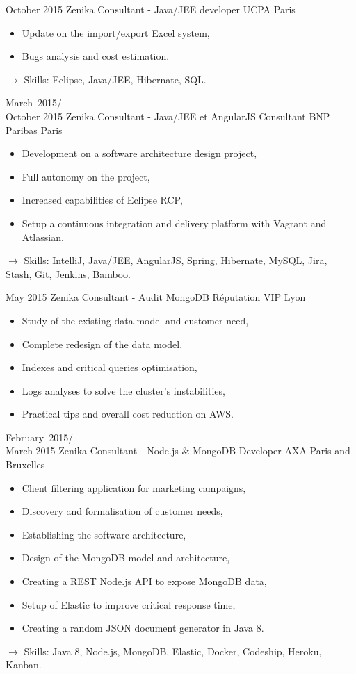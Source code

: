 \documentclass[11pt,a4paper]{moderncv}
\begin{document}
\cventry
{October 2015}
{Zenika Consultant - Java/JEE developer}
{UCPA}
{Paris}
{}
{\begin{itemize}
\item Update on the import/export Excel system,
\item Bugs analysis and cost estimation.
\end{itemize}
$\rightarrow$ Skills: Eclipse, Java/JEE, Hibernate, SQL.
}   %

\cventry
{March\ 2015/\\October 2015}
{Zenika Consultant - Java/JEE et AngularJS Consultant}
{BNP Paribas}
{Paris}
{}
{\begin{itemize}
\item Development on a software architecture design project,
\item Full autonomy on the project,
\item Increased capabilities of Eclipse RCP,
\item Setup a continuous integration and delivery platform with Vagrant and Atlassian.
\end{itemize}
$\rightarrow$ Skills: IntelliJ, Java/JEE, AngularJS, Spring, Hibernate, MySQL, Jira, Stash, Git, Jenkins, Bamboo.
}   %

\cventry
{May 2015}
{Zenika Consultant - Audit MongoDB}
{Réputation VIP}
{Lyon}
{}
{\begin{itemize}
\item Study of the existing data model and customer need,
\item Complete redesign of the data model,
\item Indexes and critical queries optimisation,
\item Logs analyses to solve the cluster's instabilities,
\item Practical tips and overall cost reduction on AWS.
\end{itemize}
}   %

\cventry
{February\ 2015/\\March 2015}
{Zenika Consultant - Node.js \& MongoDB Developer}
{AXA}
{Paris and Bruxelles}
{}
{\begin{itemize}
\item Client filtering application for marketing campaigns,
\item Discovery and formalisation of customer needs,
\item Establishing the software architecture,
\item Design of the MongoDB model and architecture,
\item Creating a REST Node.js API to expose MongoDB data,
\item Setup of Elastic to improve critical response time,
\item Creating a random JSON document generator in Java 8.
\end{itemize}
$\rightarrow$ Skills: Java 8, Node.js, MongoDB, Elastic, Docker, Codeship, Heroku, Kanban.
}   %
\end{document}

